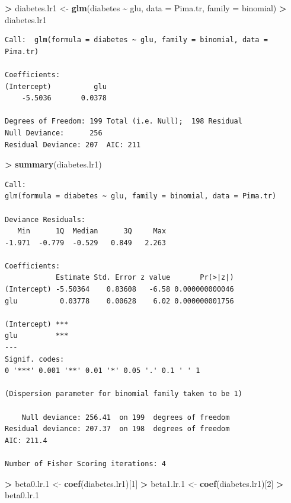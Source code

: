 \documentclass[
]{krantz}
\makeatletter
\newenvironment{Shaded}{\begin{snugshade}}{\end{snugshade}}
\newcommand{\DataTypeTok}[1]{\textcolor[rgb]{0.27,0.27,0.27}{#1}}
\newcommand{\DecValTok}[1]{\textcolor[rgb]{0.06,0.06,0.06}{#1}}
\newcommand{\FloatTok}[1]{\textcolor[rgb]{0.06,0.06,0.06}{#1}}
\newcommand{\KeywordTok}[1]{\textcolor[rgb]{0.27,0.27,0.27}{\textbf{#1}}}
\newcommand{\NormalTok}[1]{#1}
\newcommand{\OperatorTok}[1]{\textcolor[rgb]{0.43,0.43,0.43}{\textbf{#1}}}
\newcommand{\StringTok}[1]{\textcolor[rgb]{0.5,0.5,0.5}{#1}}
\newenvironment{kframe}{%
\medskip{}
\setlength{\fboxsep}{.8em}
 \def\at@end@of@kframe{}%
 \ifinner\ifhmode%
  \def\at@end@of@kframe{\end{minipage}}%
  \begin{minipage}{\columnwidth}%
 \fi\fi%
 \def\FrameCommand##1{\hskip\@totalleftmargin \hskip-\fboxsep
 \colorbox{shadecolor}{##1}\hskip-\fboxsep
     \hskip-\linewidth \hskip-\@totalleftmargin \hskip\columnwidth}%
 \MakeFramed {\advance\hsize-\width
   \@totalleftmargin\z@ \linewidth\hsize
   \@setminipage}}%
 {\par\unskip\endMakeFramed%
 \at@end@of@kframe}
\renewenvironment{Shaded}{\begin{kframe}}{\end{kframe}}
\makeatother
\begin{document}
\begin{Shaded}
\begin{Highlighting}[]
\OperatorTok{\textgreater{}}\StringTok{ }\NormalTok{diabetes.lr1 \textless{}{-}}\StringTok{ }\KeywordTok{glm}\NormalTok{(diabetes }\OperatorTok{\textasciitilde{}}\StringTok{ }\NormalTok{glu, }\DataTypeTok{data =}\NormalTok{ Pima.tr, }\DataTypeTok{family =}\NormalTok{ binomial)}
\OperatorTok{\textgreater{}}\StringTok{ }\NormalTok{diabetes.lr1}
\end{Highlighting}
\end{Shaded}

\begin{verbatim}
Call:  glm(formula = diabetes ~ glu, family = binomial, data = Pima.tr)

Coefficients:
(Intercept)          glu  
    -5.5036       0.0378  

Degrees of Freedom: 199 Total (i.e. Null);  198 Residual
Null Deviance:      256 
Residual Deviance: 207  AIC: 211
\end{verbatim}

\begin{Shaded}
\begin{Highlighting}[]
\OperatorTok{\textgreater{}}\StringTok{ }\KeywordTok{summary}\NormalTok{(diabetes.lr1)}
\end{Highlighting}
\end{Shaded}

\begin{verbatim}
Call:
glm(formula = diabetes ~ glu, family = binomial, data = Pima.tr)

Deviance Residuals: 
   Min      1Q  Median      3Q     Max  
-1.971  -0.779  -0.529   0.849   2.263  

Coefficients:
            Estimate Std. Error z value       Pr(>|z|)
(Intercept) -5.50364    0.83608   -6.58 0.000000000046
glu          0.03778    0.00628    6.02 0.000000001756
               
(Intercept) ***
glu         ***
---
Signif. codes:  
0 '***' 0.001 '**' 0.01 '*' 0.05 '.' 0.1 ' ' 1

(Dispersion parameter for binomial family taken to be 1)

    Null deviance: 256.41  on 199  degrees of freedom
Residual deviance: 207.37  on 198  degrees of freedom
AIC: 211.4

Number of Fisher Scoring iterations: 4
\end{verbatim}

\begin{Shaded}
\begin{Highlighting}[]
\OperatorTok{\textgreater{}}\StringTok{ }\NormalTok{beta0.lr}\FloatTok{.1}\NormalTok{ \textless{}{-}}\StringTok{ }\KeywordTok{coef}\NormalTok{(diabetes.lr1)[}\DecValTok{1}\NormalTok{]}
\OperatorTok{\textgreater{}}\StringTok{ }\NormalTok{beta1.lr}\FloatTok{.1}\NormalTok{ \textless{}{-}}\StringTok{ }\KeywordTok{coef}\NormalTok{(diabetes.lr1)[}\DecValTok{2}\NormalTok{]}
\OperatorTok{\textgreater{}}\StringTok{ }\NormalTok{beta0.lr}\FloatTok{.1}
\end{Highlighting}
\end{Shaded}
\end{document}

